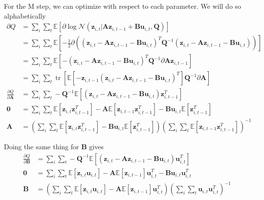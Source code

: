 \documentclass[a4paper,11pt]{article}
\DeclareMathOperator*{\tr}{tr}
\begin{document}
For the M step, we can optimize with respect to each parameter. We will do so alphabetically
\begin{align*}
\partial Q &= \sum\limits_i\sum\limits_t \mathbb{E}[
  \partial \log \mathcal{N}(\mathbf{z}_{i,t}
    | \mathbf{A}\mathbf{z}_{i,t-1}+ \mathbf{B}\mathbf{u}_{i,t}, \mathbf{Q}
  )
] \\
&= \sum\limits_i\sum\limits_t \mathbb{E}\left[
  -\frac{1}{2} \partial \left(
    \left(\mathbf{z}_{i,t} - \mathbf{A}\mathbf{z}_{i,t-1}- \mathbf{B}\mathbf{u}_{i,t}\right)^T
    \mathbf{Q}^{-1}
    \left(\mathbf{z}_{i,t} - \mathbf{A}\mathbf{z}_{i,t-1}- \mathbf{B}\mathbf{u}_{i,t}\right)
  \right)
\right] \\
&= \sum\limits_i\sum\limits_t \mathbb{E}\left[
  - \left(\mathbf{z}_{i,t} - \mathbf{A}\mathbf{z}_{i,t-1}- \mathbf{B}\mathbf{u}_{i,t}\right)^T
  \mathbf{Q}^{-1}
  \partial \mathbf{A} \mathbf{z}_{i,t-1}
\right] \\
&= \sum\limits_i\sum\limits_t \tr\left[
  \mathbb{E}\left[
    - \mathbf{z}_{i,t-1}
    \left(\mathbf{z}_{i,t} - \mathbf{A}\mathbf{z}_{i,t-1}- \mathbf{B}\mathbf{u}_{i,t}\right)^T
  \right]
  \mathbf{Q}^{-1}
  \partial \mathbf{A} 
\right] \\
\frac{\partial Q}{\partial \mathbf{A}} &=
\sum\limits_i\sum\limits_t -\mathbf{Q}^{-1} \mathbb{E}\left[
  \left(\mathbf{z}_{i,t} - \mathbf{A}\mathbf{z}_{i,t-1}- \mathbf{B}\mathbf{u}_{i,t}\right)
  \mathbf{z}_{i,t-1}^T
\right] \\
\mathbf{0} &= \sum\limits_i\sum\limits_t
\mathbb{E}\left[\mathbf{z}_{i,t} \mathbf{z}_{i,t-1}^T\right]
- \mathbf{A}\mathbb{E}\left[\mathbf{z}_{i,t-1}\mathbf{z}_{i,t-1}^T\right]
- \mathbf{B}\mathbf{u}_{i,t}\mathbb{E}[\mathbf{z}_{i,t-1}^T] \\
\mathbf{A} &= \left(
  \sum\limits_i\sum\limits_t
  \mathbb{E}\left[\mathbf{z}_{i,t} \mathbf{z}_{i,t-1}^T\right]
  - \mathbf{B}\mathbf{u}_{i,t}\mathbb{E}\left[\mathbf{z}_{i,t-1}^T\right]
\right)\left(
  \sum\limits_i\sum\limits_t
  \mathbb{E}\left[\mathbf{z}_{i,t-1}\mathbf{z}_{i,t-1}^T\right]
\right)^{-1}
\end{align*} 

Doing the same thing for $\mathbf{B}$ gives
\begin{align*}
\frac{\partial Q}{\partial \mathbf{B}} &= 
\sum\limits_i\sum\limits_t -\mathbf{Q}^{-1} \mathbb{E}\left[
  \left(\mathbf{z}_{i,t} - \mathbf{A}\mathbf{z}_{i,t-1}- \mathbf{B}\mathbf{u}_{i,t}\right)
  \mathbf{u}_{i,t}^T
\right] \\
\mathbf{0} &= \sum\limits_i\sum\limits_t 
\mathbb{E}\left[\mathbf{z}_{i,t} \mathbf{u}_{i,t}\right]
- \mathbf{A}\mathbb{E}[\mathbf{z}_{i,t-1}] \mathbf{u}_{i,t}^T
- \mathbf{B}\mathbf{u}_{i,t}\mathbf{u}_{i,t}^T \\
\mathbf{B} &= \left(
  \sum\limits_i\sum\limits_t 
  \mathbb{E}\left[\mathbf{z}_{i,t} \mathbf{u}_{i,t}\right]
  - \mathbf{A}\mathbb{E}[\mathbf{z}_{i,t-1}] \mathbf{u}_{i,t}^T
\right) \left(
  \sum\limits_i\sum\limits_t 
  \mathbf{u}_{i,t}\mathbf{u}_{i,t}^T
\right) ^{-1} \\
\end{align*}
\end{document}
